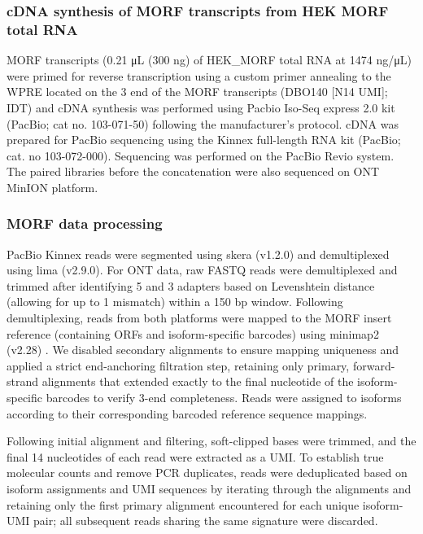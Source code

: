 \subsubsection{cDNA synthesis of MORF transcripts from HEK MORF total RNA}\label{cdna-synthesis-of-morf-transcripts-from-hek-morf-total-rna}

MORF transcripts (0.21 μL (300 ng) of HEK\_MORF total RNA at 1474 ng/μL) were primed for reverse transcription using a custom primer annealing to the WPRE located on the 3\p{} end of the MORF transcripts (DBO140 {[}N14 UMI{]}; IDT) and cDNA synthesis was performed using Pacbio Iso-Seq express 2.0 kit (PacBio; cat no. 103-071-50) following the manufacturer's protocol. cDNA was prepared for PacBio sequencing using the Kinnex full-length RNA kit (PacBio; cat. no 103-072-000). Sequencing was performed on the PacBio Revio system. The paired libraries before the concatenation were also sequenced on ONT MinION platform.

\subsubsection{MORF data processing}\label{morf-data-processing}

PacBio Kinnex reads were segmented using skera (v1.2.0) and demultiplexed using lima (v2.9.0). For ONT data, raw FASTQ reads were demultiplexed and trimmed after identifying 5\p{} and 3\p{} adapters based on Levenshtein distance (allowing for up to 1 mismatch) within a 150 bp window. Following demultiplexing, reads from both platforms were mapped to the MORF insert reference (containing ORFs and isoform-specific barcodes) using minimap2 (v2.28) \citep{li2018}. We disabled secondary alignments to ensure mapping uniqueness and applied a strict end-anchoring filtration step, retaining only primary, forward-strand alignments that extended exactly to the final nucleotide of the isoform-specific barcodes to verify 3\p{}-end completeness. Reads were assigned to isoforms according to their corresponding barcoded reference sequence mappings.

Following initial alignment and filtering, soft-clipped bases were trimmed, and the final 14 nucleotides of each read were extracted as a UMI. To establish true molecular counts and remove PCR duplicates, reads were deduplicated based on isoform assignments and UMI sequences by iterating through the alignments and retaining only the first primary alignment encountered for each unique isoform-UMI pair; all subsequent reads sharing the same signature were discarded.

